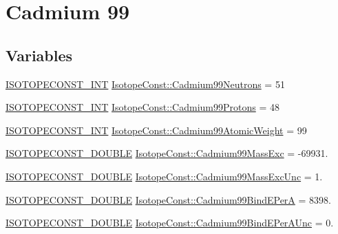 \hypertarget{group___isotope_const-_cadmium-_cd99}{}\section{Cadmium 99}
\label{group___isotope_const-_cadmium-_cd99}
\subsection*{Variables}
\begin{DoxyCompactItemize}
\item 
\mbox{\hyperlink{group___isotope_const-_macros_ga5f18360b3e99483a35c32d789e62621c}{I\+S\+O\+T\+O\+P\+E\+C\+O\+N\+S\+T\+\_\+\+I\+NT}} \mbox{\hyperlink{group___isotope_const-_cadmium-_cd99_ga234ec942cc9521a32418a244d256c130}{Isotope\+Const\+::\+Cadmium99\+Neutrons}} = 51
\item 
\mbox{\hyperlink{group___isotope_const-_macros_ga5f18360b3e99483a35c32d789e62621c}{I\+S\+O\+T\+O\+P\+E\+C\+O\+N\+S\+T\+\_\+\+I\+NT}} \mbox{\hyperlink{group___isotope_const-_cadmium-_cd99_ga34aed348158cf056816d841c27bd8741}{Isotope\+Const\+::\+Cadmium99\+Protons}} = 48
\item 
\mbox{\hyperlink{group___isotope_const-_macros_ga5f18360b3e99483a35c32d789e62621c}{I\+S\+O\+T\+O\+P\+E\+C\+O\+N\+S\+T\+\_\+\+I\+NT}} \mbox{\hyperlink{group___isotope_const-_cadmium-_cd99_gae57d9936e2651e5b116056cbb75352a9}{Isotope\+Const\+::\+Cadmium99\+Atomic\+Weight}} = 99
\item 
\mbox{\hyperlink{group___isotope_const-_macros_ga8f45a7272ce02c0b4c65c44636ed719a}{I\+S\+O\+T\+O\+P\+E\+C\+O\+N\+S\+T\+\_\+\+D\+O\+U\+B\+LE}} \mbox{\hyperlink{group___isotope_const-_cadmium-_cd99_gacd1e4889f197adf8d5d63014fe8d6b89}{Isotope\+Const\+::\+Cadmium99\+Mass\+Exc}} = -\/69931.
\item 
\mbox{\hyperlink{group___isotope_const-_macros_ga8f45a7272ce02c0b4c65c44636ed719a}{I\+S\+O\+T\+O\+P\+E\+C\+O\+N\+S\+T\+\_\+\+D\+O\+U\+B\+LE}} \mbox{\hyperlink{group___isotope_const-_cadmium-_cd99_ga92405a391fea4ecb6b27c4943ea6c51c}{Isotope\+Const\+::\+Cadmium99\+Mass\+Exc\+Unc}} = 1.
\item 
\mbox{\hyperlink{group___isotope_const-_macros_ga8f45a7272ce02c0b4c65c44636ed719a}{I\+S\+O\+T\+O\+P\+E\+C\+O\+N\+S\+T\+\_\+\+D\+O\+U\+B\+LE}} \mbox{\hyperlink{group___isotope_const-_cadmium-_cd99_gad08fe99711c4e5ced47b5aee730788aa}{Isotope\+Const\+::\+Cadmium99\+Bind\+E\+PerA}} = 8398.
\item 
\mbox{\hyperlink{group___isotope_const-_macros_ga8f45a7272ce02c0b4c65c44636ed719a}{I\+S\+O\+T\+O\+P\+E\+C\+O\+N\+S\+T\+\_\+\+D\+O\+U\+B\+LE}} \mbox{\hyperlink{group___isotope_const-_cadmium-_cd99_ga26af7b3fb3e451da19d4f6e93d6225b4}{Isotope\+Const\+::\+Cadmium99\+Bind\+E\+Per\+A\+Unc}} = 0.

\end{DoxyCompactItemize}
